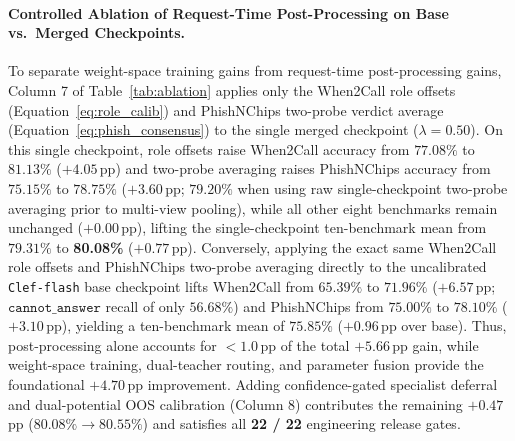 \documentclass[10pt,twocolumn]{article}
\begin{document}
\paragraph{Controlled Ablation of Request-Time Post-Processing on Base vs.\ Merged Checkpoints.}
To separate weight-space training gains from request-time post-processing gains, Column 7 of Table~\ref{tab:ablation} applies only the When2Call role offsets (Equation~\ref{eq:role_calib}) and PhishNChips two-probe verdict average (Equation~\ref{eq:phish_consensus}) to the single merged checkpoint ($\lambda = 0.50$). On this single checkpoint, role offsets raise When2Call accuracy from $77.08\%$ to $81.13\%$ ($+4.05$\,pp) and two-probe averaging raises PhishNChips accuracy from $75.15\%$ to $78.75\%$ ($+3.60$\,pp; $79.20\%$ when using raw single-checkpoint two-probe averaging prior to multi-view pooling), while all other eight benchmarks remain unchanged ($+0.00$\,pp), lifting the single-checkpoint ten-benchmark mean from $79.31\%$ to \textbf{80.08\%} ($+0.77$\,pp). Conversely, applying the exact same When2Call role offsets and PhishNChips two-probe averaging directly to the uncalibrated \texttt{Clef-flash} base checkpoint lifts When2Call from $65.39\%$ to $71.96\%$ ($+6.57$\,pp; $\texttt{cannot\_answer}$ recall of only $56.68\%$) and PhishNChips from $75.00\%$ to $78.10\%$ ($+3.10$\,pp), yielding a ten-benchmark mean of $75.85\%$ ($+0.96$\,pp over base). Thus, post-processing alone accounts for $<1.0$\,pp of the total $+5.66$\,pp gain, while weight-space training, dual-teacher routing, and parameter fusion provide the foundational $+4.70$\,pp improvement. Adding confidence-gated specialist deferral and dual-potential OOS calibration (Column 8) contributes the remaining $+0.47$\,pp ($80.08\% \to 80.55\%$) and satisfies all \textbf{22 / 22} engineering release gates.
\end{document}

